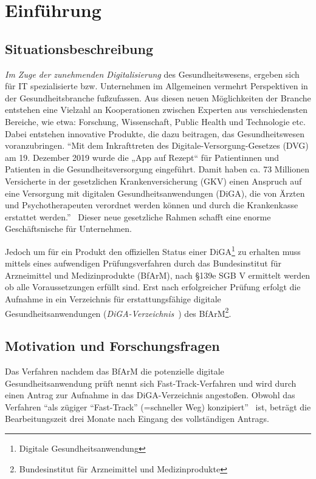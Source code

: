 \section{Einführung}
\subsection{Situationsbeschreibung}
\emph{Im Zuge der zunehmenden Digitalisierung} des Gesundheitswesens, ergeben sich für IT spezialisierte bzw. Unternehmen im Allgemeinen vermehrt Perspektiven in der Gesundheitsbranche fußzufassen. 
Aus diesen neuen Möglichkeiten der Branche entstehen eine Vielzahl an Kooperationen zwischen Experten aus verschiedensten Bereiche, wie etwa: Forschung, Wissenschaft, Public Health und Technologie etc. Dabei entstehen innovative Produkte, die dazu beitragen, das Gesundheitswesen voranzubringen. ``Mit dem Inkrafttreten des Digitale-Versorgung-Gesetzes (DVG) am 19. Dezember 2019 wurde die „App auf Rezept“ für Patientinnen und Patienten in die Gesundheitsversorgung eingeführt. 
Damit haben ca. 73 Millionen Versicherte in der gesetzlichen Krankenversicherung (GKV) einen Anspruch auf eine Versorgung mit digitalen Gesundheitsanwendungen (DiGA), die von Ärzten und Psychotherapeuten verordnet werden können und durch die Krankenkasse erstattet werden.''~\cite{leitfadenfasttrack}  
Dieser neue gesetzliche Rahmen schafft eine enorme Geschäftsnische für Unternehmen. 

Jedoch um für ein Produkt den offiziellen Status einer DiGA\footnote{Digitale Gesundheitsanwendung} zu erhalten muss mittels eines aufwendigen Prüfungsverfahren durch das Bundesinstitut für Arzneimittel und Medizinprodukte (BfArM), nach §139e SGB V ermittelt werden ob alle Voraussetzungen erfüllt sind. Erst nach erfolgreicher Prüfung erfolgt die Aufnahme in ein Verzeichnis für erstattungsfähige digitale Gesundheitsanwendungen (\textit{DiGA-Verzeichnis}~\cite{digaverzeichnis}) des BfArM\footnote{Bundesinstitut für Arzneimittel und Medizinprodukte\label{ftn:bfarm}}.

\subsection{Motivation und Forschungsfragen}
Das Verfahren nachdem das BfArM die potenzielle digitale Gesundheitsanwendung prüft nennt sich Fast-Track-Verfahren und wird durch einen Antrag zur Aufnahme in das DiGA-Verzeichnis angestoßen. Obwohl das Verfahren ``als zügiger ``Fast-Track'' (=schneller Weg) konzipiert''~\cite{digahersteller} ist, beträgt die Bearbeitungszeit drei Monate nach Eingang des vollständigen Antrags.

